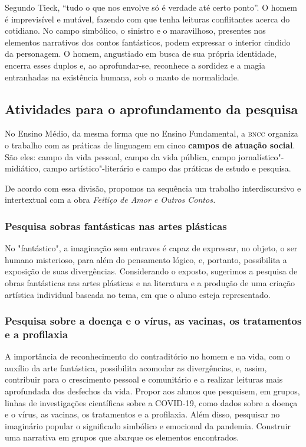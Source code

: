 \documentclass[11pt]{extarticle}
\begin{document}
Segundo Tieck, ``tudo o que nos envolve só é verdade até certo ponto''.
O homem é imprevisível e mutável, fazendo com que tenha leituras
conflitantes acerca do cotidiano. No campo simbólico, o sinistro e o
maravilhoso, presentes nos elementos narrativos dos contos fantásticos,
podem expressar o interior cindido da personagem. O homem, angustiado em
busca de sua própria identidade, encerra esses duplos e, ao
aprofundar-se, reconhece a sordidez e a magia entranhadas na existência
humana, sob o manto de normalidade.

\subsection{Atividades para o aprofundamento da pesquisa}


No Ensino Médio, da mesma forma que no Ensino Fundamental, a \textsc{bncc}
organiza o trabalho com as práticas de linguagem em cinco \textbf{campos
de atuação social}. São eles: campo da vida pessoal, campo da vida
pública, campo jornalístico"-midiático, campo artístico"-literário e campo
das práticas de estudo e pesquisa.

De acordo com essa divisão, propomos na sequência um trabalho
interdiscursivo e intertextual com a obra \emph{Feitiço de Amor e Outros
Contos.}

\subsubsection{Pesquisa sobras fantásticas nas artes plásticas}

No "fantástico", a imaginação sem entraves é capaz de expressar, no
objeto, o ser humano misterioso, para além do pensamento lógico, e,
portanto, possibilita a exposição de suas divergências. Considerando o
exposto, sugerimos a pesquisa de obras fantásticas nas artes plásticas
e na literatura e a produção de uma criação artística individual
baseada no tema, em que o aluno esteja representado.


\subsubsection{Pesquisa sobre a doença
e o vírus, as vacinas, os tratamentos e a profilaxia}

A importância de reconhecimento do contraditório no homem e na vida,
com o auxílio da arte fantástica, possibilita acomodar as
divergências, e, assim, contribuir para o crescimento pessoal e
comunitário e a realizar leituras mais aprofundada dos desfechos da
vida. Propor aos alunos que pesquisem, em grupos, linhas de
investigações científicas sobre a COVID-19, como dados sobre a doença
e o vírus, as vacinas, os tratamentos e a profilaxia. Além disso,
pesquisar no imaginário popular o significado simbólico e emocional da
pandemia. Construir uma narrativa em grupos que abarque os elementos
encontrados.
\end{document}
